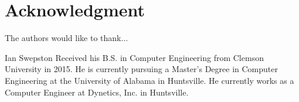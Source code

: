 \documentclass[journal]{IEEEtran}
\begin{document}
\section*{Acknowledgment}


The authors would like to thank...


\ifCLASSOPTIONcaptionsoff
  \newpage
\fi







%
 
 

% 

\begin{IEEEbiographynophoto}{Ian Swepston}
 Received his B.S. in Computer Engineering from Clemson University in 2015. He is currently pursuing a Master's Degree in Computer Engineering at the University of Alabama in Huntsville. He currently works as a Computer Engineer at Dynetics, Inc. in Huntsville.
\end{IEEEbiographynophoto}
\end{document}
